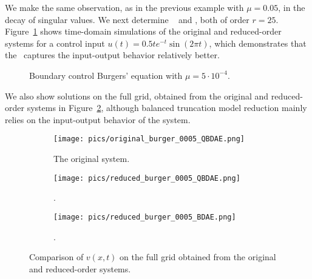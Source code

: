 We make the same observation, as in the previous example with $\mu = 0.05$, in the decay of singular values. We next determine \redQBbal~ and \redBbal, both of order $r = 25$. Figure~\ref{fig:2} shows  time-domain simulations of the original and reduced-order systems for a control input $u(t) = 0.5te^{-t}\sin(2\pi t)$, which demonstrates that the \redQBbal~captures the input-output behavior relatively better.
\begin{figure}[h]
        \centering
 \begin{subfigure}[h]{0.49\textwidth}
  \centering
	\setlength\fheight{3cm}
	\setlength\fwidth{5.5cm}
	
 \end{subfigure}
 \begin{subfigure}[h]{0.49\textwidth}
  \centering
	\setlength\fheight{3cm}
	\setlength\fwidth{5.5cm}
	
 \end{subfigure}
 \caption{Boundary control Burgers' equation with $\mu = 5\cdot 10^{-4}$.}
\label{fig:2}
\end{figure}

We also show solutions on the full grid, obtained from the original and reduced-order systems in Figure~\ref{fig:burger_full_grid}, although  balanced truncation model reduction mainly relies on the input-output behavior of the system.
\begin{figure}[h]
        \centering
 \begin{subfigure}[t]{0.32\textwidth}
  \centering
	\texttt{[image: pics/original\_burger\_0005\_QBDAE.png]}
	\caption{The original system.}
 \end{subfigure}
 \begin{subfigure}[t]{0.32\textwidth}
  \centering
	\texttt{[image: pics/reduced\_burger\_0005\_QBDAE.png]}
	\caption{\redQBbal.}
 \end{subfigure}
 \begin{subfigure}[t]{0.32\textwidth}
  \centering
	\texttt{[image: pics/reduced\_burger\_0005\_BDAE.png]}
	\caption{\redBbal.}
 \end{subfigure}
 \caption{Comparison of $v(x,t)$ on the full grid obtained from the original and reduced-order systems.}
 \label{fig:burger_full_grid}
 \end{figure}

